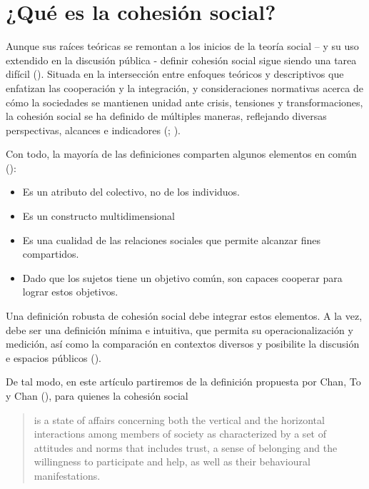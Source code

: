 \documentclass[
  letterpaper,
  DIV=11,
  numbers=noendperiod]{scrartcl}
\providecommand{\tightlist}{%
  \setlength{\itemsep}{0pt}\setlength{\parskip}{0pt}}\usepackage{longtable,booktabs,array}
\begin{document}
\section{¿Qué es la cohesión
social?}\label{quuxe9-es-la-cohesiuxf3n-social}

Aunque sus raíces teóricas se remontan a los inicios de la teoría social
-- y su uso extendido en la discusión pública - definir cohesión social
sigue siendo una tarea difícil
(). Situada
en la intersección entre enfoques teóricos y descriptivos que enfatizan
las cooperación y la integración, y consideraciones normativas acerca de
cómo la sociedades se mantienen unidad ante crisis, tensiones y
transformaciones, la cohesión social se ha definido de múltiples
maneras, reflejando diversas perspectivas, alcances e indicadores
(;
).

Con todo, la mayoría de las definiciones comparten algunos elementos en
común ():

\begin{itemize}
\tightlist
\item
  Es un atributo del colectivo, no de los individuos.
\item
  Es un constructo multidimensional
\item
  Es una cualidad de las relaciones sociales que permite alcanzar fines
  compartidos.
\item
  Dado que los sujetos tiene un objetivo común, son capaces cooperar
  para lograr estos objetivos.
\end{itemize}

Una definición robusta de cohesión social debe integrar estos elementos.
A la vez, debe ser una definición mínima e intuitiva, que permita su
operacionalización y medición, así como la comparación en contextos
diversos y posibilite la discusión e espacios públicos
().

De tal modo, en este artículo partiremos de la definición propuesta por
Chan, To y Chan (), para
quienes la cohesión social

\begin{quote}
is a state of aﬀairs concerning both the vertical and the horizontal
interactions among members of society as characterized by a set of
attitudes and norms that includes trust, a sense of belonging and the
willingness to participate and help, as well as their behavioural
manifestations.
\end{quote}
\end{document}
